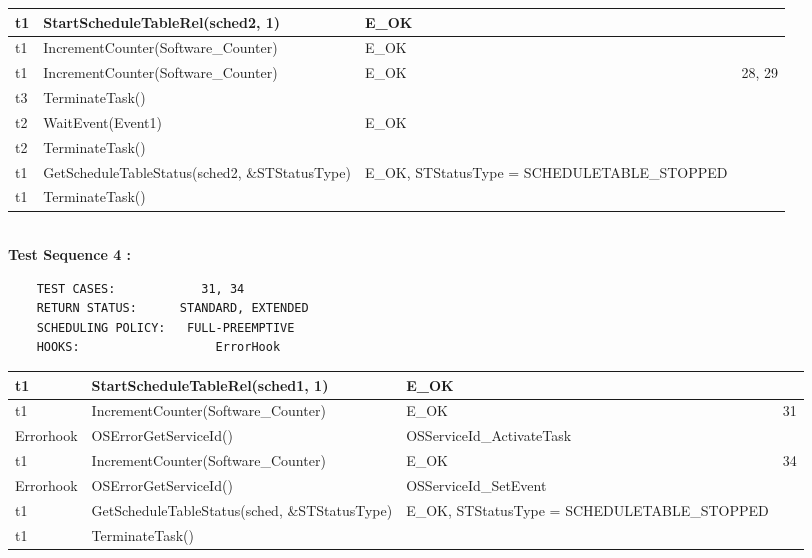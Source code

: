 \documentclass[10pt]{article}
\newlength{\Li}\settowidth{\Li}{Running}
\newlength{\Lii}\setlength{\Lii}{7cm}
\newlength{\Liiii}\setlength{\Liiii}{0.9cm}
\newlength{\Liii}\setlength{\Liii}{\textwidth} \addtolength{\Liii}{-\Li} \addtolength{\Liii}{-\Lii} \addtolength{\Liii}{-\Liiii}
\begin{document}
\begin{supertabular}{|p{\Li}|p{\Lii}|p{\Liii}|p{\Liiii}|}
	t1	& StartScheduleTableRel(sched2, 1)										& E\_OK												& \\ \hline
	t1	& IncrementCounter(Software\_Counter)										& E\_OK												& \\ \hline
	t1	& IncrementCounter(Software\_Counter)										& E\_OK												& 28, 29 \\ \hline

	t3	& TerminateTask()														& 													& \\ \hline

	t2	& WaitEvent(Event1)														& E\_OK												& \\ \hline
	t2	& TerminateTask()														& 													& \\ \hline

	t1	& GetScheduleTableStatus(sched2, \&STStatusType)							& E\_OK, STStatusType = SCHEDULETABLE\_STOPPED		& \\ \hline
	t1	& TerminateTask()														& 													& \\ \hline
	\end{supertabular}\\
		
	\textbf{Test Sequence 4 :}
	\begin{lstlisting}
	TEST CASES:		       31, 34
	RETURN STATUS:	  	STANDARD, EXTENDED
	SCHEDULING POLICY:   FULL-PREEMPTIVE
	HOOKS:			         ErrorHook
	\end{lstlisting}
	
	
	\begin{supertabular}{|p{\Li}|p{\Lii}|p{\Liii}|p{\Liiii}|} \hline 
	t1		& StartScheduleTableRel(sched1, 1)										& E\_OK												& \\ \hline
	t1		& IncrementCounter(Software\_Counter)										& E\_OK												& 31\\ \hline
	Errorhook	& OSErrorGetServiceId()													& OSServiceId\_ActivateTask								& \\ \hline
	t1		& IncrementCounter(Software\_Counter)										& E\_OK												& 34\\ \hline
	Errorhook	& OSErrorGetServiceId()													& OSServiceId\_SetEvent									& \\ \hline
	t1		& GetScheduleTableStatus(sched, \&STStatusType)							& E\_OK, STStatusType = SCHEDULETABLE\_STOPPED		& \\ \hline
	t1		& TerminateTask()														& 													& \\ \hline
	\end{supertabular}\\
	
\end{document}
